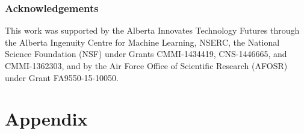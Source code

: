 \documentclass{article}
\begin{document}
\subsubsection*{Acknowledgements}
This work was supported by the Alberta Innovates Technology Futures through the Alberta Ingenuity Centre for Machine Learning, NSERC, the National Science Foundation (NSF) under Grants CMMI-1434419, CNS-1446665, and CMMI-1362303, and by the Air Force Office of Scientific Research (AFOSR) under Grant FA9550-15-10050.


\clearpage
\newpage
\begin{small}


\end{small}

\clearpage
\newpage
\onecolumn
 \section*{Appendix}


\end{document}
